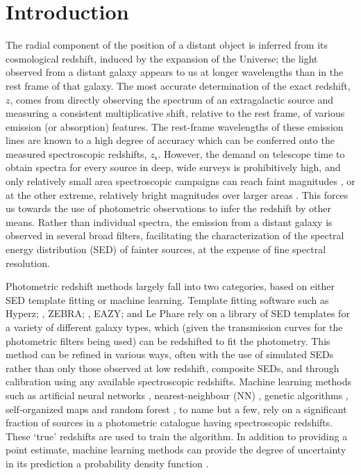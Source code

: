 \documentclass[useAMS,usenatbib,fleqn]{mn2e}
\begin{document}
\section{Introduction}
The radial component of the position of a distant object is inferred from its cosmological redshift, induced by the expansion of the Universe; the light observed from a distant galaxy appears to us at longer wavelengths than in the rest frame of that galaxy. The most accurate determination of the exact redshift, $z$, comes from directly observing the spectrum of an extragalactic source and measuring a consistent multiplicative shift, relative to the rest frame, of various emission (or absorption) features. The rest-frame wavelengths of these emission lines are known to a high degree of accuracy which can be conferred onto the measured spectroscopic redshifts, $z_\textrm{s}$. However, the demand on telescope time to obtain spectra for every source in deep, wide surveys is prohibitively high, and only relatively small area spectroscopic campaigns can reach faint magnitudes \citep[e.g.][]{Lilly2009,LeFevre2013,LeFevre2015}, or at the other extreme, relatively bright magnitudes over larger areas \citep[e.g.][]{2dfgrs,GAMA,SDSS3}.
This forces us towards the use of photometric observations to infer the redshift by other means. Rather than individual spectra, the emission from a distant galaxy is observed in several broad filters, facilitating the characterization of the spectral energy distribution (SED) of fainter sources, at the expense of fine spectral resolution.

Photometric redshift methods largely fall into two categories, based on either SED template fitting or machine learning. Template fitting software such as {\sc Hyperz}; \citep[][]{Hyperz}, {\sc ZEBRA}; \citep{ZEBRA}, {\sc EAZY}; \citep[][]{EAZY} and {\sc Le Phare} \citep[][]{Ilbert2006} rely on a library of SED templates for a variety of different galaxy types, which (given the transmission curves for the photometric filters being used) can be redshifted to fit the photometry. This method can be refined in various ways, often with the use of simulated SEDs rather than only those observed at low redshift, composite SEDs, and through calibration using any available spectroscopic redshifts. Machine learning methods such as artificial neural networks \citep[e.g. {\sc ANNz};][]{Firth2003,Collister04}, nearest-neighbour (NN) \citep{Ball2008}, genetic algorithms \citep[e.g.][]{Hogan2015}, self-organized maps \citep[][]{Geach2012} and random forest \citep[][]{kind2013}, to name but a few, rely on a significant fraction of sources in a photometric catalogue having spectroscopic redshifts. These `true' redshifts are used to train the algorithm. In addition to providing a point estimate, machine learning methods can provide the degree of uncertainty in its prediction a probability density function \citep{kind2013,bonnett2015,rau2015}.
\end{document}
